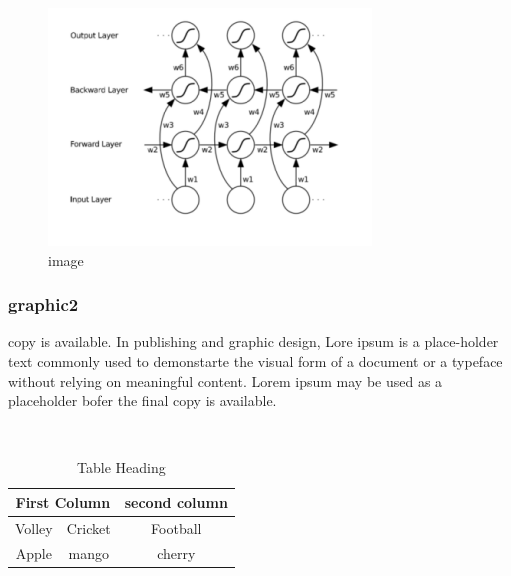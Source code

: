 \documentclass{article}
\begin{document}
\begin{figure}[h]
    \centering
    \includegraphics{assets/image1.png}
    \caption{image}
    \label{fig: an image label}
\end{figure}

\subsubsection{graphic2}

copy is available. In publishing and graphic design, Lore ipsum is a place-holder text commonly used to demonstarte the visual form of a document or a typeface without relying on meaningful content. Lorem ipsum may be used as a placeholder bofer the final copy is available.
\begin{table}[h]
    \centering
    \caption{Table Heading}
    \\
    \begin{tabular}{|c|c|c|c|}
        \hline
        \multicolumn{2}{|c|}{First Column} & \multicolumn{2}{c|}{second column}                                 \\
        \hline
        Volley                             & Cricket                       & \multicolumn{2}{c|}{Football} \\
        \hline
        Apple                              & mango                         & \multicolumn{2}{c|}{cherry}   \\
        \hline
    \end{tabular}
\end{table}
\end{document}

